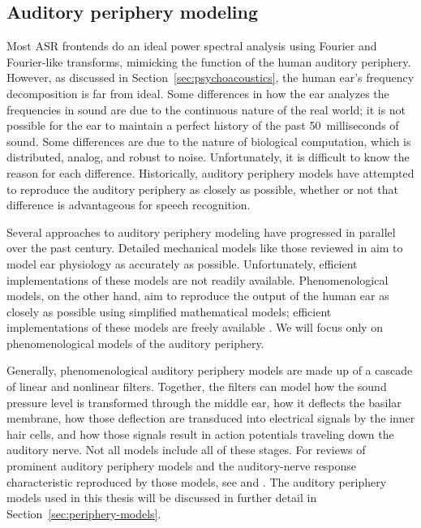 \subsection{Auditory periphery modeling}

Most ASR frontends do an ideal
power spectral analysis
using Fourier and Fourier-like transforms,
mimicking the function
of the human auditory periphery.
However, as discussed in Section~\ref{sec:psychoacoustics},
the human ear's frequency decomposition
is far from ideal.
Some differences in how the ear
analyzes the frequencies in sound
are due to the continuous nature
of the real world;
it is not possible for the ear
to maintain a perfect history
of the past 50~milliseconds of sound.
Some differences are due to
the nature of biological computation,
which is distributed, analog,
and robust to noise.
Unfortunately, it is difficult to know
the reason for each difference.
Historically, auditory periphery models
have attempted to reproduce
the auditory periphery as closely as possible,
whether or not that difference is advantageous
for speech recognition.

Several approaches to auditory periphery modeling
have progressed in parallel over the past century.
Detailed mechanical models
like those reviewed in \citet{ni2014}
aim to model ear physiology
as accurately as possible.
Unfortunately, efficient implementations
of these models are not readily available.
Phenomenological models, on the other hand,
aim to reproduce the output
of the human ear
as closely as possible
using simplified mathematical models;
efficient implementations of these
models are freely available
\citep{fontaine2011}.
We will focus only on phenomenological
models of the auditory periphery.

Generally, phenomenological auditory periphery models
are made up of a cascade of linear and nonlinear filters.
Together, the filters can model
how the sound pressure level
is transformed through the middle ear,
how it deflects the basilar membrane,
how those deflection are transduced
into electrical signals
by the inner hair cells,
and how those signals result in
action potentials traveling down
the auditory nerve.
Not all models include all of these stages.
For reviews of prominent
auditory periphery models and
the auditory-nerve response characteristic
reproduced by those models,
see \citet{lopez2005}
and \citet{lyon2010}.
The auditory periphery models used
in this thesis will be discussed
in further detail in
Section~\ref{sec:periphery-models}.

